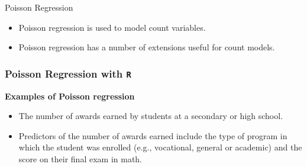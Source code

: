 \documentclass[MASTER.tex]{subfiles}
\begin{document}
%
 
\begin{frame}
	
	{\Large
		Poisson Regression
	}
	\begin{itemize}
		\item Poisson regression is used to model count variables.
		\item Poisson regression has a number of extensions useful for count models.

	\end{itemize}
\end{frame}




% 

%

\begin{frame}[fragile]

\frametitle{Poisson Regression with \texttt{R} } 
 
 \Large	
 
 \textbf{Examples of Poisson regression} \\
 	
 \begin{itemize}	
 \item The number of awards earned by students at a secondary or high school. 
 \item Predictors of the number of awards earned include the type of program in which the student was enrolled (e.g., vocational, general or academic) and the score on their final exam in math.
 \end{itemize}
 
\end{frame}
\end{document}
